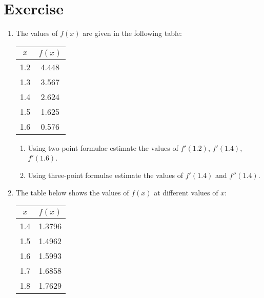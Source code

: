 \documentclass[12pt,class=book,crop=false]{standalone}
\begin{document}
\section{Exercise}
\begin{enumerate}
    \item The values of  $ f(x) $ are given in the following table:
          \begin{table}[H]
              \centering
              \begin{tabular}{cS[table-format=1.3]}
                  \toprule
                  $ x $    &  \\   & 4.448 \\
                  1.3   & 3.567 \\
                  1.4   &2.624 \\
                  1.5   & 1.625 \\
                  1.6   &0.576 \\\bottomrule
              \end{tabular}
          \end{table}
          \begin{enumerate}
              \item Using two-point  formulae estimate the values of $ f'(1.2) $, $ f' (1.4) $, $ f' (1.6) $.
              \item  Using three-point formulae estimate the values of $ f' (1.4) $ and $ f''(1.4) $.
          \end{enumerate}
    \item The table below shows the values of $ f(x) $ at different values of  $ x $:
          \begin{table}[H]
              \centering
              \begin{tabular}{cS[table-format=1.4]}
                  \toprule
                  $ x $    &  \\    & 1.3796 \\
                   1.5    &  1.4962 \\
                   1.6    & 1.5993 \\
                   1.7    & 1.6858 \\
                   1.8    & 1.7629 \\\bottomrule
              \end{tabular}
          \end{table}
          \begin{enumerate}

\end{enumerate}
\end{enumerate}
\end{document}
